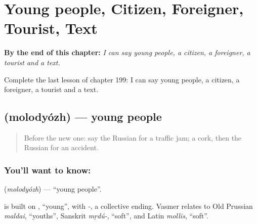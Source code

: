 
\chapter{Young people, Citizen, Foreigner, Tourist, Text}
\label{ch:ru-young-people-citizen-foreigner-tourist-text}

\begin{chapteropening}
\textbf{By the end of this chapter:} \emph{I can say young people, a citizen, a foreigner, a tourist and a text.}

Complete the last lesson of chapter 199: I can say young people, a citizen, a foreigner, a tourist and a text.
\end{chapteropening}

\section[\texorpdfstring{\ru{молодёжь} (molodyózh)}{молодёжь (molodyózh)}]{ (molodyózh) — young people}

\label{lesson:RU-C199-molodyozh}



\begin{quote}
Before the new one: say the Russian for a traffic jam; a cork, then the Russian for an accident.
\end{quote}

\subsection*{You'll want to know: }
\textbf{} (\emph{molodyózh}) — \textquotedblleft{}young people\textquotedblright{}.

\begin{cousinweb}
\textbf{} is built on \emph{}, \textquotedblleft{}young\textquotedblright{}, with \emph{-}, a collective ending. Vasmer relates \emph{} to Old Prussian \emph{maldai}, \textquotedblleft{}youths\textquotedblright{}, Sanskrit \emph{mṛdú-}, \textquotedblleft{}soft\textquotedblright{}, and Latin \emph{mollis}, \textquotedblleft{}soft\textquotedblright{}.
\end{cousinweb}

